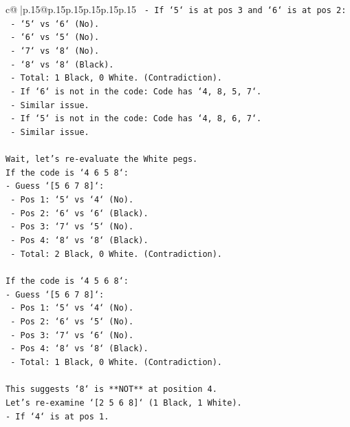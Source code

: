 \documentclass{article}
\begin{document}
{\begin{supertabular}{c@{$\;$}|p{.15\linewidth}@{}p{.15\linewidth}p{.15\linewidth}p{.15\linewidth}p{.15\linewidth}p{.15\linewidth}}
{{{\texttt{        {-} If `5` is at pos 3 and `6` is at pos 2:} \\
\texttt{            {-} `5` vs `6` (No).} \\
\texttt{            {-} `6` vs `5` (No).} \\
\texttt{            {-} `7` vs `8` (No).} \\
\texttt{            {-} `8` vs `8` (Black).} \\
\texttt{            {-} Total: 1 Black, 0 White. (Contradiction).} \\
\texttt{    {-} If `6` is not in the code: Code has `4, 8, 5, 7`.} \\
\texttt{        {-} Similar issue.} \\
\texttt{    {-} If `5` is not in the code: Code has `4, 8, 6, 7`.} \\
\texttt{        {-} Similar issue.} \\
\\ 
\texttt{Wait, let's re{-}evaluate the White pegs.} \\
\texttt{If the code is `4 6 5 8`:} \\
\texttt{{-} Guess `{[}5 6 7 8{]}`:} \\
\texttt{    {-} Pos 1: `5` vs `4` (No).} \\
\texttt{    {-} Pos 2: `6` vs `6` (Black).} \\
\texttt{    {-} Pos 3: `7` vs `5` (No).} \\
\texttt{    {-} Pos 4: `8` vs `8` (Black).} \\
\texttt{    {-} Total: 2 Black, 0 White. (Contradiction).} \\
\\ 
\texttt{If the code is `4 5 6 8`:} \\
\texttt{{-} Guess `{[}5 6 7 8{]}`:} \\
\texttt{    {-} Pos 1: `5` vs `4` (No).} \\
\texttt{    {-} Pos 2: `6` vs `5` (No).} \\
\texttt{    {-} Pos 3: `7` vs `6` (No).} \\
\texttt{    {-} Pos 4: `8` vs `8` (Black).} \\
\texttt{    {-} Total: 1 Black, 0 White. (Contradiction).} \\
\\ 
\texttt{This suggests `8` is **NOT** at position 4.} \\
\texttt{Let's re{-}examine `{[}2 5 6 8{]}` (1 Black, 1 White).} \\
\texttt{{-} If `4` is at pos 1.} \\
}}}
\end{supertabular}}
\end{document}
